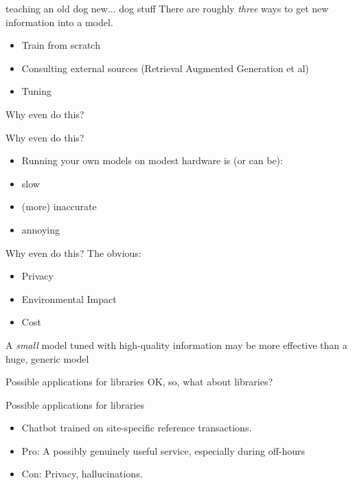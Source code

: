 \documentclass{beamer}
\begin{document}
\begin{frame}{teaching an old dog new... dog stuff}
There are roughly \textit{three} ways to get new information into a model.
\begin{itemize}
	\pause
	\item Train from scratch
	\pause
	\item Consulting external sources (Retrieval Augmented Generation et al)
	\pause
	\item Tuning
\end{itemize}
\end{frame}
	
	
	
\begin{frame}
	Why even do this?
\end{frame}
	
\begin{frame}{Why even do this?}
\begin{itemize}
	\item Running your own models on modest hardware is (or can be):
	\pause
	\item slow
	\pause
	\item (more) inaccurate
	\pause
	\item annoying
\end{itemize}  
\end{frame}

\begin{frame}{Why even do this?}
	The obvious:
	\begin{itemize}
		\item Privacy
		\pause
		\item Environmental Impact
		\pause 
		\item Cost
		
	\end{itemize}
\end{frame}


\begin{frame}
	A \textit{small} model tuned with high-quality information may be more effective than a huge, generic model
\end{frame}


\begin{frame}{Possible applications for libraries}
	OK, so, what about libraries?
\end{frame}

\begin{frame}{Possible applications for libraries}
	\begin{itemize}
		\item Chatbot trained on site-specific reference transactions.
		\pause
		\item Pro: A possibly genuinely useful service, especially during off-hours
		\pause
		\item Con: Privacy, hallucinations.
	\end{itemize}
\end{frame}
\end{document}
